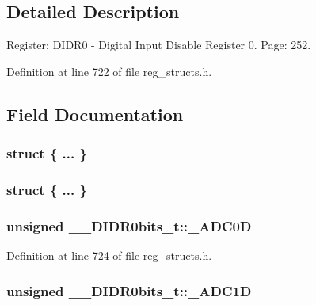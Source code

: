 \subsection{Detailed Description}
Register\+: D\+I\+D\+R0 -\/ Digital Input Disable Register 0. Page\+: 252. 

Definition at line 722 of file reg\+\_\+structs.\+h.



\subsection{Field Documentation}
\hypertarget{union_____d_i_d_r0bits__t_a6e5cc5e98254bd6227c57612fae778d8}{\subsubsection[{"@175}]{\setlength{\rightskip}{0pt plus 5cm}struct \{ ... \} }}\label{union_____d_i_d_r0bits__t_a6e5cc5e98254bd6227c57612fae778d8}
\hypertarget{union_____d_i_d_r0bits__t_a7bcd629628cf5cb2cafb57e186a4197b}{\subsubsection[{"@177}]{\setlength{\rightskip}{0pt plus 5cm}struct \{ ... \} }}\label{union_____d_i_d_r0bits__t_a7bcd629628cf5cb2cafb57e186a4197b}
\hypertarget{union_____d_i_d_r0bits__t_a448e66d4d8b6a92ceab81a378624dbc0}{
\subsubsection[{\+\_\+\+A\+D\+C0\+D}]{\setlength{\rightskip}{0pt plus 5cm}unsigned \+\_\+\+\_\+\+D\+I\+D\+R0bits\+\_\+t\+::\+\_\+\+A\+D\+C0\+D}}\label{union_____d_i_d_r0bits__t_a448e66d4d8b6a92ceab81a378624dbc0}


Definition at line 724 of file reg\+\_\+structs.\+h.

\hypertarget{union_____d_i_d_r0bits__t_af3db2ed35abd787a2516c4fb4235d921}{
\subsubsection[{\+\_\+\+A\+D\+C1\+D}]{\setlength{\rightskip}{0pt plus 5cm}unsigned \+\_\+\+\_\+\+D\+I\+D\+R0bits\+\_\+t\+::\+\_\+\+A\+D\+C1\+D}}\label{union_____d_i_d_r0bits__t_af3db2ed35abd787a2516c4fb4235d921}



